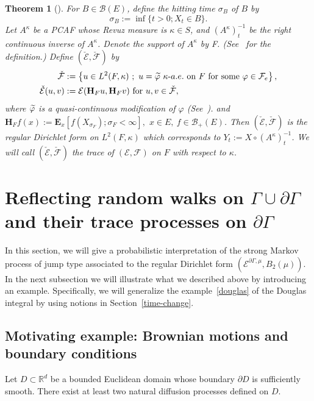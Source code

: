 \documentclass[10pt]{amsart}
\newtheorem{theo}{Theorem}[section]
\theoremstyle{definition}\newtheorem{defi}[theo]{Definition}\newtheorem{rema}[theo]{Remark}\newtheorem{exam}[theo]{Example}\newtheorem{exem}[theo]{Example}\newtheorem{nota}[theo]{Notation}
\newcommand{\ce}{\mathcal{E}}
\newcommand{\cf}{\mathcal{F}}
\newcommand{\cb}{\mathcal{B}}
\newcommand{\br}{\mathbb{R}}
\newcommand{\bfE}{\mathbf{E}}
\newcommand{\bfH}{\mathbf{H}}
\let\oldtilde\tilde
\renewcommand*{\tilde}[1]{\mathchoice{\widetilde{#1}}{\widetilde{#1}}{\oldtilde{#1}}{\oldtilde{#1}}}
\begin{document}
\begin{theo}[{\cite[Theorem~6.2.1]{FOT}\cite[Theorem~5.2.2]{CF}}]\label{tc}
For $B\in\cb(E)$, define the hitting time $\sigma_B$ of $B$ by
\[
\sigma_B:=\inf\{t>0; X_t\in B\}.
\]
Let $A^{\kappa}$ be a PCAF whose Revuz measure is $\kappa\in S$, and $(A^{\kappa})^{-1}_t$ be the right continuous inverse of $A^{\kappa}$. Denote the support of $A^{\kappa}$ by F. (See~\cite[p.~234]{FOT} for the definition.) Define $(\check{\ce},\check{\cf})$ by
\begin{align*}
\check{\cf}&:=\left\{u\in L^2(F,\kappa)\ ;\ u=\tilde{\varphi}\ \kappa\mathchar`-a.e.\ \text{on}\ F\ \text{for\ some}\ \varphi\in\cf_e\right\},\\
\check{\ce}(u,v)&:=\ce(\bfH_Fu,\bfH_Fv)\ \text{for}\ u,v\in\check{\cf},
\end{align*}
where $\tilde{\varphi}$ is a quasi-continuous modification of $\varphi$ (See~\cite[Theorem~2.1.3]{FOT}). and $\bfH_Ff(x):=\bfE_x\left[f(X_{\sigma_F}); \sigma_F<\infty\right],$ $x\in E,\ f\in\cb_+(E)$. Then $(\check{\ce},\check{\cf})$ is the regular Dirichlet form on $L^2(F,\kappa)$ which corresponds to $Y_t:=X\circ (A^{\kappa})^{-1}_t$. We will call $(\check{\ce},\check{\cf})$ the trace of $(\ce,\cf)$ on $F$ with respect to $\kappa$.
\end{theo}



\section{Reflecting random walks on \texorpdfstring{$\Gamma\cup\partial\Gamma$}{GammaU partial Gamma} and their trace processes on \texorpdfstring{$\partial\Gamma$}{partial Gamma}}\label{reflecting-rw}


In this section, we will give a probabilistic interpretation of the strong Markov process of jump type associated to the regular Dirichlet form $(\ce^{\partial\Gamma,\mu},B_2(\mu))$. In the next subsection we will illustrate what we described above by introducing an example. Specifically, we will generalize the example~\eqref{douglas} of the Douglas integral by using notions in Section~\ref{time-change}.

\subsection{Motivating example: Brownian motions and boundary conditions}

Let $D\subset\br^d$ be a bounded Euclidean domain whose boundary $\partial D$ is sufficiently smooth. There exist at least two natural diffusion processes defined on $D$.
\end{document}
